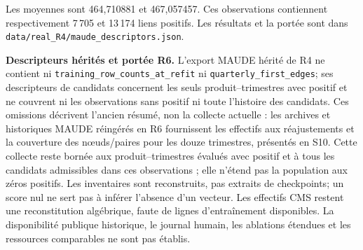 \documentclass[10pt,a4paper]{article}
\newcommand{\src}[1]{{\small\nolinkurl{#1}}}
\begin{document}
Les moyennes sont 464,710881 et 467,057457. Ces observations contiennent respectivement 7\,705 et 13\,174 liens positifs. Les résultats et la portée sont dans \src{data/real_R4/maude_descriptors.json}.

\textbf{Descripteurs hérités et portée R6.} L'export MAUDE hérité de R4 ne contient ni \src{training_row_counts_at_refit} ni \src{quarterly_first_edges}; ses descripteurs de candidats concernent les seuls produit--trimestres avec positif et ne couvrent ni les observations sans positif ni toute l'histoire des candidats. Ces omissions décrivent l'ancien résumé, non la collecte actuelle : les archives et historiques MAUDE réingérés en R6 fournissent les effectifs aux réajustements et la couverture des nœuds/paires pour les douze trimestres, présentés en S10. Cette collecte reste bornée aux produit--trimestres évalués avec positif et à tous les candidats admissibles dans ces observations ; elle n'étend pas la population aux zéros positifs. Les inventaires sont reconstruits, pas extraits de checkpoints; un score nul ne sert pas à inférer l'absence d'un vecteur. Les effectifs CMS restent une reconstitution algébrique, faute de lignes d'entraînement disponibles. La disponibilité publique historique, le journal humain, les ablations étendues et les ressources comparables ne sont pas établis.
\end{document}
